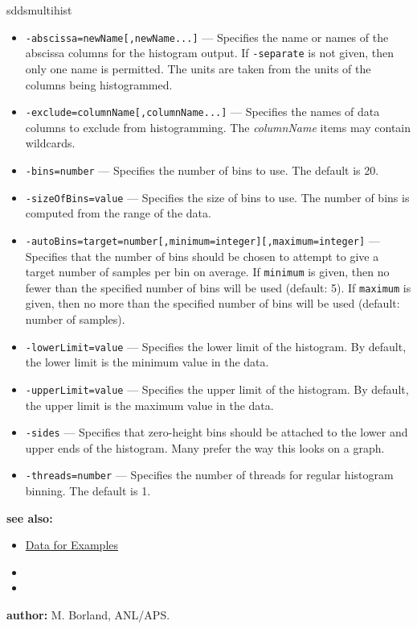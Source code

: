 \begin{sddsprog}{sddsmultihist}
\begin{itemize}
      \item \verb|-abscissa=newName[,newName...]| --- Specifies the name or names of the abscissa columns for the histogram
        output. If \verb|-separate| is not given, then only one name is permitted. The units are taken from the units of the
        columns being histogrammed.
      \item \verb|-exclude=columnName[,columnName...]| --- Specifies the names of data columns to exclude from histogramming. The
        \emph{columnName} items may contain wildcards.
      \item \verb|-bins=number| --- Specifies the number of bins to use. The default is 20.
      \item \verb|-sizeOfBins=value| --- Specifies the size of bins to use. The number of bins is computed from the range of the
        data.
      \item \verb|-autoBins=target=number[,minimum=integer][,maximum=integer]| --- Specifies that the number of bins should be
        chosen to attempt to give a target number of samples per bin on average. If \verb|minimum| is given, then no fewer than
        the specified number of bins will be used (default: 5). If \verb|maximum| is given, then no more than the specified number
        of bins will be used (default: number of samples).
      \item \verb|-lowerLimit=value| --- Specifies the lower limit of the histogram. By default, the lower limit is the minimum
        value in the data.
      \item \verb|-upperLimit=value| --- Specifies the upper limit of the histogram. By default, the upper limit is the maximum
        value in the data.
      \item \verb|-sides| --- Specifies that zero-height bins should be attached to the lower and upper ends of the histogram.
        Many prefer the way this looks on a graph.
      \item \verb|-threads=number| --- Specifies the number of threads for regular histogram binning. The default is 1.
    \end{itemize}
  \item \textbf{see also:}
    \begin{itemize}
      \item \hyperref[exampleData]{Data for Examples}
      \item {}
      \item {}
    \end{itemize}
  \item \textbf{author:} M. Borland, ANL/APS.
\end{sddsprog}
